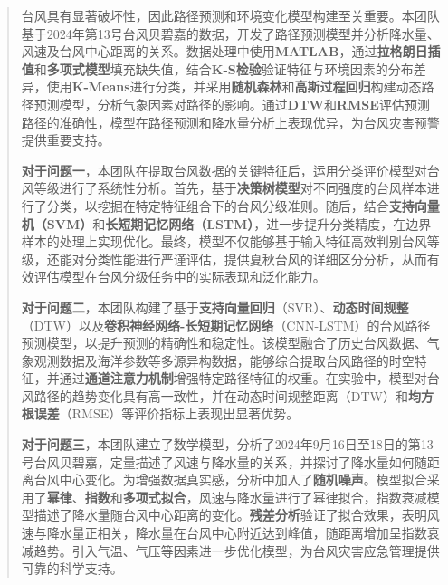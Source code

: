\documentclass[withoutpreface,bwprint]{cumcmthesis}
\begin{document}
\begin{abstract}

台风具有显著破坏性，因此路径预测和环境变化模型构建至关重要。本团队基于2024年第13号台风贝碧嘉的数据，开发了路径预测模型并分析降水量、风速及台风中心距离的关系。数据处理中使用\textbf{MATLAB}，通过\textbf{拉格朗日插值}和\textbf{多项式模型}填充缺失值，结合\textbf{K-S检验}验证特征与环境因素的分布差异，使用\textbf{K-Means}进行分类，并采用\textbf{随机森林}和\textbf{高斯过程回归}构建动态路径预测模型，分析气象因素对路径的影响。通过\textbf{DTW}和\textbf{RMSE}评估预测路径的准确性，模型在路径预测和降水量分析上表现优异，为台风灾害预警提供重要支持。

\textbf{对于问题一}，本团队在提取台风数据的关键特征后，运用分类评价模型对台风等级进行了系统性分析。首先，基于\textbf{决策树模型}对不同强度的台风样本进行了分类，以挖掘在特定特征组合下的台风分级准则。随后，结合\textbf{支持向量机（SVM）}和\textbf{长短期记忆网络（LSTM）}，进一步提升分类精度，在边界样本的处理上实现优化。最终，模型不仅能够基于输入特征高效判别台风等级，还能对分类性能进行严谨评估，提供夏秋台风的详细区分分析，从而有效评估模型在台风分级任务中的实际表现和泛化能力。

\textbf{对于问题二}，本团队构建了基于\textbf{支持向量回归}（SVR）、\textbf{动态时间规整}（DTW）以及\textbf{卷积神经网络-长短期记忆网络}（CNN-LSTM）的台风路径预测模型，以提升预测的精确性和稳定性。该模型融合了历史台风数据、气象观测数据及海洋参数等多源异构数据，能够综合提取台风路径的时空特征，并通过\textbf{通道注意力机制}增强特定路径特征的权重。在实验中，模型对台风路径的趋势变化具有高一致性，并在动态时间规整距离（DTW）和\textbf{均方根误差}（RMSE）等评价指标上表现出显著优势。

\textbf{对于问题三}，本团队建立了数学模型，分析了2024年9月16日至18日的第13号台风贝碧嘉，定量描述了风速与降水量的关系，并探讨了降水量如何随距离台风中心变化。为增强数据真实感，分析中加入了\textbf{随机噪声}。模型拟合采用了\textbf{幂律}、\textbf{指数}和\textbf{多项式拟合}，风速与降水量进行了幂律拟合，指数衰减模型描述了降水量随台风中心距离的变化。\textbf{残差分析}验证了拟合效果，表明风速与降水量正相关，降水量在台风中心附近达到峰值，随距离增加呈指数衰减趋势。引入气温、气压等因素进一步优化模型，为台风灾害应急管理提供可靠的科学支持。

\vspace{1em}

\end{abstract}
\end{document}
